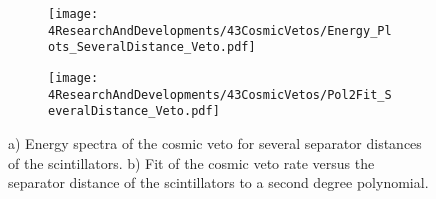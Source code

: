 \begin{figure}
\centering
    \begin{subfigure}[b]{0.85\textwidth}
    \centering
    \texttt{[image: 4ResearchAndDevelopments/43CosmicVetos/Energy\_Plots\_SeveralDistance\_Veto.pdf]}  
    \caption{\label{subfig:EnergySpectrumsSeveralDistanceVeto}}
    \end{subfigure}
    \hfill
    \begin{subfigure}[b]{0.85\textwidth}
    \centering
    \texttt{[image: 4ResearchAndDevelopments/43CosmicVetos/Pol2Fit\_SeveralDistance\_Veto.pdf]}  
    \caption{\label{subfig:LinearFitSeveralDistanceVeto}}
    \end{subfigure}
 \caption{a) Energy spectra of the cosmic veto for several separator distances of the scintillators. b) Fit of the cosmic veto rate versus the separator distance of the scintillators to a second degree polynomial.}
 \label{fig:DistanceVeto}
\end{figure}

